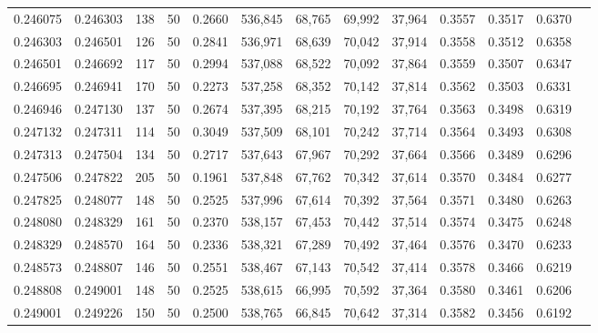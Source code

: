 \begin{tabular}{rrrrrrrrrrrrr}
0.246075 & 0.246303 &   138 &  50 &                                     0.2660 & 536,845 &  68,765 &  69,992 &  37,964 & 0.3557 & 0.3517 & 0.6370 \\
0.246303 & 0.246501 &   126 &  50 &                                     0.2841 & 536,971 &  68,639 &  70,042 &  37,914 & 0.3558 & 0.3512 & 0.6358 \\
0.246501 & 0.246692 &   117 &  50 &                                     0.2994 & 537,088 &  68,522 &  70,092 &  37,864 & 0.3559 & 0.3507 & 0.6347 \\
0.246695 & 0.246941 &   170 &  50 &                                     0.2273 & 537,258 &  68,352 &  70,142 &  37,814 & 0.3562 & 0.3503 & 0.6331 \\
0.246946 & 0.247130 &   137 &  50 &                                     0.2674 & 537,395 &  68,215 &  70,192 &  37,764 & 0.3563 & 0.3498 & 0.6319 \\
0.247132 & 0.247311 &   114 &  50 &                                     0.3049 & 537,509 &  68,101 &  70,242 &  37,714 & 0.3564 & 0.3493 & 0.6308 \\
0.247313 & 0.247504 &   134 &  50 &                                     0.2717 & 537,643 &  67,967 &  70,292 &  37,664 & 0.3566 & 0.3489 & 0.6296 \\
0.247506 & 0.247822 &   205 &  50 &                                     0.1961 & 537,848 &  67,762 &  70,342 &  37,614 & 0.3570 & 0.3484 & 0.6277 \\
0.247825 & 0.248077 &   148 &  50 &                                     0.2525 & 537,996 &  67,614 &  70,392 &  37,564 & 0.3571 & 0.3480 & 0.6263 \\
0.248080 & 0.248329 &   161 &  50 &                                     0.2370 & 538,157 &  67,453 &  70,442 &  37,514 & 0.3574 & 0.3475 & 0.6248 \\
0.248329 & 0.248570 &   164 &  50 &                                     0.2336 & 538,321 &  67,289 &  70,492 &  37,464 & 0.3576 & 0.3470 & 0.6233 \\
0.248573 & 0.248807 &   146 &  50 &                                     0.2551 & 538,467 &  67,143 &  70,542 &  37,414 & 0.3578 & 0.3466 & 0.6219 \\
0.248808 & 0.249001 &   148 &  50 &                                     0.2525 & 538,615 &  66,995 &  70,592 &  37,364 & 0.3580 & 0.3461 & 0.6206 \\
0.249001 & 0.249226 &   150 &  50 &                                     0.2500 & 538,765 &  66,845 &  70,642 &  37,314 & 0.3582 & 0.3456 & 0.6192 \\

\end{tabular}
